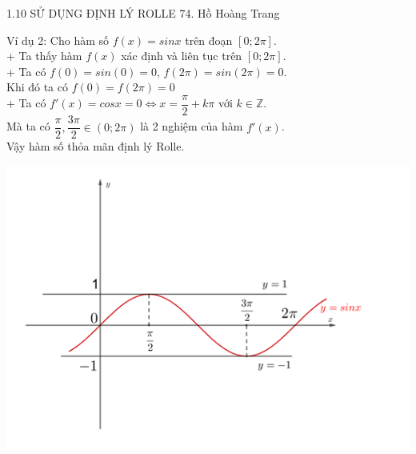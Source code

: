 \begin{frame}{{1.10 SỬ DỤNG ĐỊNH LÝ ROLLE \hspace{4cm}  74. Hồ Hoàng Trang}}

    \begin{minipage}{0.5\linewidth}
    \begin{block}{Ví dụ 2:}
    Cho hàm số $f(x)=sinx$ trên đoạn $\left[0;2\pi\right].$\\
    \pause
    + Ta thấy hàm $f(x)$ xác định và liên tục trên $\left[0;2\pi\right]$.\\
    \pause
    + Ta có $f(0)=sin(0)=0$, $f(2\pi)=sin(2\pi)=0$.\\ Khi đó ta có $f(0)=f(2\pi)=0$\\
    \pause
    + Ta có $f'(x)=cosx=0\Leftrightarrow x=\dfrac{\pi}{2}+k\pi$ với $k\in \mathbb{Z}$.\\
     Mà ta có $\dfrac{\pi}{2}, \dfrac{3\pi}{2} \in (0; 2\pi)$ là 2 nghiệm của hàm $f'(x)$.\\
     \pause
     Vậy hàm số thỏa mãn định lý Rolle.
    \end{block}
    \end{minipage}\qquad
\begin{minipage}{0.4\linewidth}
			\includegraphics[scale=0.57]{y=sinx.png}
\end{minipage}

    \end{frame}

